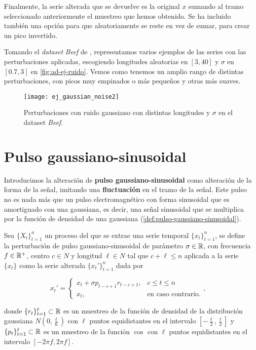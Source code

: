 Finalmente, la serie alterada que se devuelve es la original $x$ sumando al tramo seleccionado anteriormente el muestreo que hemos obtenido. Se ha incluido también una opción para que aleatoriamente se reste en vez de sumar, para crear un pico invertido.

Tomando el \emph{dataset} \emph{Beef} de \cite{bagnall2020ts}, representamos varios ejemplos de las series con las perturbaciones aplicadas, escogiendo longitudes aleatorias en $[3, 40]$ y $\sigma$ en $[0.7, 3]$ en \autoref{fig:ad-ej-ruido}. Vemos como tenemos un amplio rango de distintas perturbaciones, con picos muy empinados o más pequeños y otras más suaves.

\begin{figure}[htpb]
  \centering
  \texttt{[image: ej\_gaussian\_noise2]}
  \caption{Perturbaciones con ruido gaussiano con distintas longitudes y $\sigma$ en el dataset \emph{Beef}.}
  \label{fig:ad-ej-ruido}
\end{figure}

\section{Pulso gaussiano-sinusoidal}

Introducimos la alteración de \textbf{pulso gaussiano-sinusoidal} como alteración de la forma de la señal, imitando una \textbf{fluctuación} en el tramo de la señal. Este pulso no es nada más que un pulso electromagnético con forma sinusoidal que es amortiguado con una gaussiana, es decir, una señal sinusoidal que se multiplica por la función de densidad de una gaussiana (\autoref{def:pulso-gaussiano-sinusoidal}).

\begin{definicion}
  Sea $\{X_t\}_{t = 1}^n$ un proceso del que se extrae una serie temporal $\{x_t\}_{t = 1}^n$, se define la perturbación de pulso gaussiano-sinusoidal de parámetro $\sigma \in \mathbb{R}$, con frecuencia $f \in \mathbb{R}^{+}$, centro $c \in N$ y longitud $\ell \in N$ tal que $c + \ell \leq n$ aplicada a la serie $\{x_t\}$ como la serie alterada $\{x_t'\}_{t = 1}^n$ dada por

  $$x_t' = \begin{cases}
    x_t + \sigma p_{t - c + 1} r_{t - c + 1}, & c \leq t \leq n \\
    x_t, & \text{en caso contrario.}
  \end{cases},$$

  donde $\{r_t\}_{t = 1}^\ell \subset \mathbb{R}$ es un muestreo de la función de densidad de la distribución gaussiana $N(0, \frac{\ell}{6})$ con $\ell$ puntos equidistantes en el intervalo $[-\frac{\ell}{2}, \frac{\ell}{2}]$ y $\{p_t\}_{t = 1}^\ell \subset \mathbb{R}$ es un muestreo de la función $\cos$ con $\ell$ puntos equidistantes en el intervalo $[-2\pi f, 2\pi f]$.
  \label{def:pulso-gaussiano-sinusoidal}
\end{definicion}


